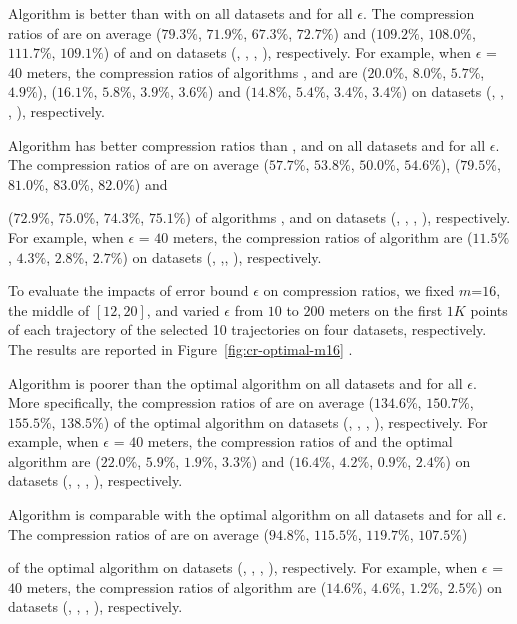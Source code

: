  Algorithm \cist is better than  with \dps on all datasets and for all $\epsilon$.
The compression ratios of \cist are on average {($79.3\%$, $71.9\%$, $67.3\%$, $72.7\%$) and ($109.2\%$, $108.0\%$, $111.7\%$, $109.1\%$)} of \squishe and
\dps on {datasets (\sercar, \geolife, \mopsi, \pricar)}, respectively.
For example, when $\epsilon$ = $40$ meters, the compression ratios of algorithms
\squishe, \cist and \dps are 
{($20.0\%$, $8.0\%$, $5.7\%$, $4.9\%$), ($16.1\%$, $5.8\%$, $3.9\%$, $3.6\%$) and ($14.8\%$, $5.4\%$, $3.4\%$, $3.4\%$)} on  {datasets (\sercar, \geolife, \mopsi, \pricar)}, respectively.

 Algorithm \cista has better compression ratios than \dpa, \squishe and \cist on all datasets and for all $\epsilon$.
The compression ratios of \cista are on average ($57.7\%$, $53.8\%$, $50.0\%$, $54.6\%$), ($79.5\%$, $81.0\%$, $83.0\%$, $82.0\%$) and {($72.9\%$, $75.0\%$, $74.3\%$, $75.1\%$) of algorithms
\squishe, \dps and \cist on {datasets (\sercar, \geolife, \mopsi, \pricar)}, respectively.
For example, when $\epsilon$ = $40$ meters, the compression ratios of algorithm
\cista are ($11.5\%$, $4.3\%$, $2.8\%$, $2.7\%$) on datasets (\sercar, \geolife,\mopsi, \pricar), respectively.

To evaluate the impacts of error bound $\epsilon$ on compression ratios, we fixed {$m$=$16$}, the middle of $[12, 20]$, and varied $\epsilon$ from $10$ to $200$ meters on the first $1K$ points of each trajectory of the selected 10 trajectories on four datasets, respectively.
The results are reported in Figure~\ref{fig:cr-optimal-m16} .

 Algorithm \cist is poorer than the optimal algorithm on all datasets and for all $\epsilon$.
More specifically, the compression ratios of \cist are on average ($134.6\%$, $150.7\%$, $155.5\%$, $138.5\%$) of the optimal algorithm on {datasets (\sercar, \geolife, \mopsi, \pricar)}, respectively.
For example, when $\epsilon$ = $40$ meters, the compression ratios of \cist and the optimal algorithm are 
($22.0\%$, $5.9\%$, $1.9\%$, $3.3\%$) and {($16.4\%$, $4.2\%$, $0.9\%$, $2.4\%$)}
on  {datasets (\sercar, \geolife, \mopsi, \pricar)}, respectively.

 Algorithm \cista is comparable with the optimal algorithm on all datasets and for all $\epsilon$.
The compression ratios of \cista are on average  ($94.8\%$, $115.5\%$, $119.7\%$, $107.5\%$)} of the optimal algorithm
 on {datasets (\sercar, \geolife, \mopsi, \pricar)}, respectively.
For example, when $\epsilon$ = $40$ meters, the compression ratios of algorithm
\cista are ($14.6\%$, $4.6\%$, $1.2\%$, $2.5\%$) on datasets (\sercar, \geolife, \mopsi, \pricar), respectively.

